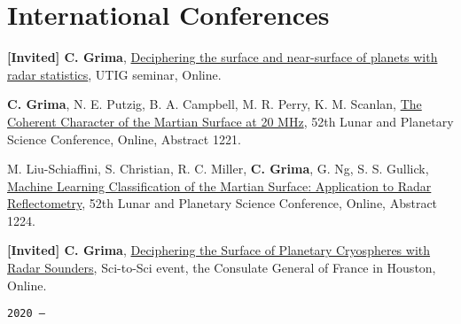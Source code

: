 \section*{International Conferences}



\begin{etaremune}
\def\labelenumi{\arabic{enumi}.}


\item
   \textbf{{[}Invited{]} C. Grima}, \href{https://twitter.com/UTGeophysics/status/1377991205414375424}{Deciphering the surface and near-surface of planets with radar statistics}, UTIG seminar, Online.
\item
  \textbf{C. Grima}, N. E. Putzig, B. A. Campbell, M. R. Perry, K. M. Scanlan, \href{https://}{The Coherent Character of the Martian Surface at 20 MHz}, 52th Lunar and Planetary Science Conference, Online, Abstract 1221.
\item
  M. Liu-Schiaffini, S. Christian, R. C. Miller, \textbf{C. Grima}, G. Ng, S. S. Gullick, \href{https://}{Machine Learning Classification of the Martian Surface: Application to Radar Reflectometry}, 52th Lunar and Planetary Science Conference, Online, Abstract 1224.
\item
  \textbf{{[}Invited{]} C. Grima}, \href{https://}{Deciphering the Surface of Planetary Cryospheres with Radar Sounders}, Sci-to-Sci event, the Consulate General of France in Houston, Online.

\hspace{-2em}\texttt{2020 ---}


\end{etaremune}
